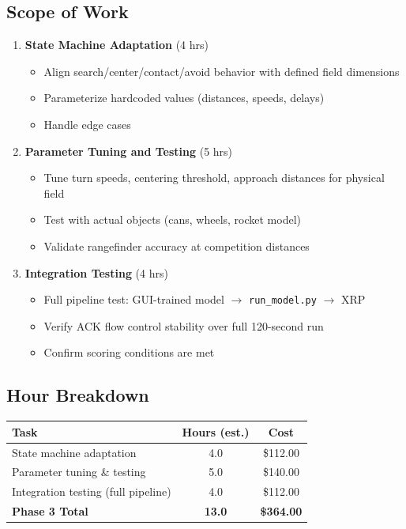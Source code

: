 \documentclass[a4paper]{article}
\begin{document}
\subsection*{Scope of Work}

\begin{enumerate}[leftmargin=*]
    \item \textbf{State Machine Adaptation} (4 hrs)
    \begin{itemize}
        \item Align search/center/contact/avoid behavior with defined field dimensions
        \item Parameterize hardcoded values (distances, speeds, delays)
        \item Handle edge cases
    \end{itemize}

    \item \textbf{Parameter Tuning and Testing} (5 hrs)
    \begin{itemize}
        \item Tune turn speeds, centering threshold, approach distances for physical field
        \item Test with actual objects (cans, wheels, rocket model)
        \item Validate rangefinder accuracy at competition distances
    \end{itemize}

    \item \textbf{Integration Testing} (4 hrs)
    \begin{itemize}
        \item Full pipeline test: GUI-trained model $\rightarrow$ \texttt{run\_model.py} $\rightarrow$ XRP
        \item Verify ACK flow control stability over full 120-second run
        \item Confirm scoring conditions are met
    \end{itemize}
\end{enumerate}

\subsection*{Hour Breakdown}

\begin{center}
\begin{tabular}{lcc}
\toprule
\textbf{Task} & \textbf{Hours (est.)} & \textbf{Cost} \\
\midrule
State machine adaptation & 4.0 & \$112.00 \\
Parameter tuning \& testing & 5.0 & \$140.00 \\
Integration testing (full pipeline) & 4.0 & \$112.00 \\
\midrule
\textbf{Phase 3 Total} & \textbf{13.0} & \textbf{\$364.00} \\
\bottomrule
\end{tabular}
\end{center}
\end{document}
